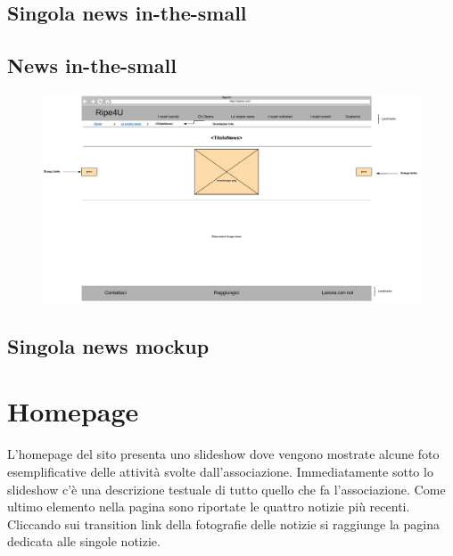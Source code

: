         \subsection{Singola news in-the-small}
        \subsection{News in-the-small}
        \begin{figure}[H]
            \centering
            \includegraphics[scale=0.37]{resources/images/singolaNews-in-the-small.jpg}
        \end{figure}

        \subsection{Singola news mockup}

    \section{Homepage}
    L'homepage del sito presenta uno slideshow dove vengono mostrate alcune foto
    esemplificative delle attività svolte dall'associazione. Immediatamente
    sotto lo slideshow c'è una descrizione testuale di tutto quello che fa
    l'associazione. Come ultimo elemento nella pagina sono riportate le quattro
    notizie più recenti. Cliccando sui transition link della fotografie delle
    notizie si raggiunge la pagina dedicata alle singole notizie.
        
